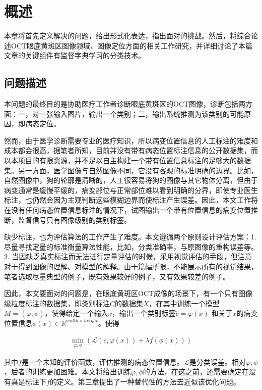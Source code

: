 \chapter{概述}
    本章将首先定义解决的问题，给出形式化表达，指出面对的挑战。然后，将综合论述OCT眼底黄斑区图像领域、图像定位方面的相关工作研究，并详细讨论了本篇文章的关键组件有监督字典学习的分类技术。

\section{问题描述}
    本问题的最终目的是协助医疗工作者诊断眼底黄斑区的OCT图像，诊断包括两方面：一，对一张输入图片，输出一个类别；二，输出系统推测为该类别的可能原因，即病态定位。

    然而，由于医学诊断需要专业的医疗知识，所以病变位置信息的人工标注的难度和成本都会很高，据笔者所知，目前并没有带有病态位置标注信息的公开数据集，而以本项目的有限资源，并不足以自主构建一个带有位置信息标注的足够大的数据集。另一方面，医学图像与自然图像不同，它没有客观的标准明确的边界。比如，自然图像中，狗的轮廓是清晰的，人工很容易将狗的图像与其它物体分离，但由于病变通常是缓慢平缓的，病变部位与正常部位难以看到明确的分界，即使专业医生标注，也仍然会因为主观判断这些模糊边界而使标注产生误差。因此，本文工作将在没有任何病态位置信息标注的情况下，试图输出一个带有位置信息的病变位置推断，监督信号只有图像级别的类别标签。

    缺少标注，也为评估算法的工作产生了难度。本文遵循两个原则设计评估方案：1. 尽量寻找定量的标准衡量算法性能，比如，分类准确率，与原图像的重构误差等。2. 当因缺乏真实标注而无法进行定量评估的时候，采用视觉评估的手段，但注意对于得到图像的理解、对模型的解释。由于篇幅所限，不能展示所有的视觉结果，笔者选取尽量典型的例子，既有效果较好的例子，又有效果较差的例子。

    因此，本文要面对的问题是，在眼底黄斑区OCT成像的场景下，有一个只有图像级粒度标注的数据集，即类别标注$C$的数据集$X$，在其中训练一个模型$M=(\varphi, \phi )$，使得给定一个输入$x$，输出一个类别标签$\tilde{c} = \varphi(x)$ 和关于$x$的病变位置信息$\phi(x) \in \mathbb{R} ^{width \times height}$。使得

    \begin{align}
        \min _{\varphi, \phi} \left(\mathcal{L}(c, \varphi (x)) + \lambda f(\phi(x)) \right)
    \end{align}

    其中$f$是一个未知的评价函数，评估推测的病态位置信息。$\mathcal{L}$是分类误差。相对$\varphi, \phi$，后者的训练更加困难。本文将给出训练$\varphi, \phi$的方法，在这之前，还需要确定在没有真是标注下$f$的定义。第三章提出了一种替代性的方法去近似该优化问题。

